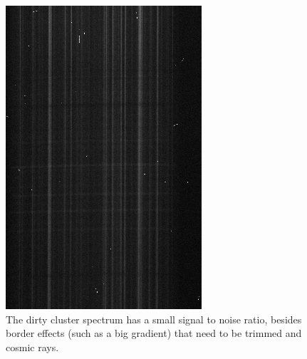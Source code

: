 \begin{figure}[H]
  \centering
  \begin{minipage}[b]{0.49\textwidth}
    \includegraphics[width=\textwidth]{images/cluster_dirty.png}
    \caption[Dirty spectrum of NGC5139]{The dirty cluster spectrum has a small signal to noise ratio, besides border effects (such as a big gradient) that need to be trimmed and cosmic rays.}
  \end{minipage}
  \hfill
  \begin{minipage}[b]{0.49\textwidth}

\end{minipage}
\end{figure}
